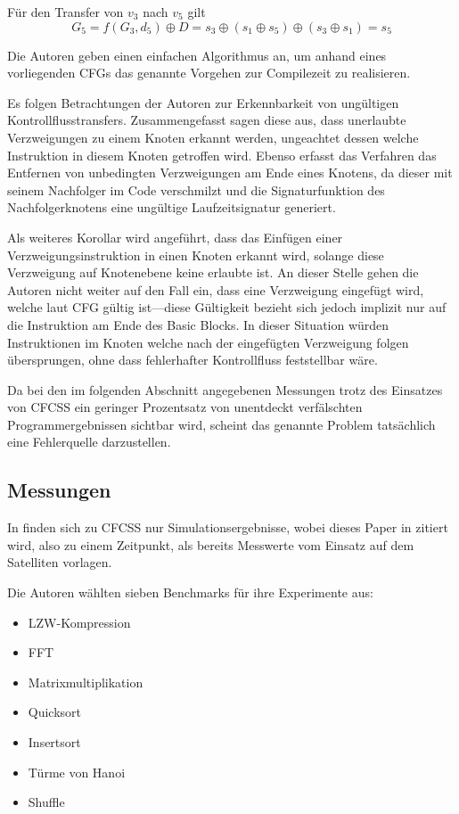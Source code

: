 \documentclass[11pt]{article}
\begin{document}
Für den Transfer von $ v_3 $ nach $ v_5 $ gilt $$ G_5 = f(G_3, d_5) \oplus
D = s_3 \oplus (s_1 \oplus s_5) \oplus (s_3 \oplus s_1) = s_5 $$

Die Autoren geben einen einfachen Algorithmus an, um anhand eines vorliegenden
CFGs das genannte Vorgehen zur Compilezeit zu realisieren.

Es folgen Betrachtungen der Autoren zur Erkennbarkeit von ungültigen
Kontrollflusstransfers. Zusammengefasst sagen diese aus, dass unerlaubte
Verzweigungen zu einem Knoten erkannt werden, ungeachtet dessen welche
Instruktion in diesem Knoten getroffen wird. Ebenso erfasst das Verfahren das
Entfernen von unbedingten Verzweigungen am Ende eines Knotens, da dieser mit
seinem Nachfolger im Code verschmilzt und die Signaturfunktion des
Nachfolgerknotens eine ungültige Laufzeitsignatur generiert.

Als weiteres Korollar wird angeführt, dass das Einfügen einer
Verzweigungsinstruktion in einen Knoten erkannt wird, solange diese Verzweigung
auf Knotenebene keine erlaubte ist. An dieser Stelle gehen die Autoren nicht
weiter auf den Fall ein, dass eine Verzweigung eingefügt wird, welche laut CFG
gültig ist—diese Gültigkeit bezieht sich jedoch implizit nur auf die
Instruktion am Ende des Basic Blocks. In dieser Situation würden Instruktionen
im Knoten welche nach der eingefügten Verzweigung folgen übersprungen, ohne
dass fehlerhafter Kontrollfluss feststellbar wäre.

Da bei den im folgenden Abschnitt angegebenen Messungen trotz des Einsatzes von
CFCSS ein geringer Prozentsatz von unentdeckt verfälschten Programmergebnissen
sichtbar wird, scheint das genannte Problem tatsächlich eine Fehlerquelle
darzustellen.

\subsection{Messungen}

In \cite{oh-2002-control} finden sich zu CFCSS nur Simulationsergebnisse, wobei
dieses Paper in \cite{argos-2002-lessons} zitiert wird, also zu einem
Zeitpunkt, als bereits Messwerte vom Einsatz auf dem Satelliten vorlagen.

Die Autoren wählten sieben Benchmarks für ihre Experimente aus:

\begin{itemize}
  \item LZW-Kompression
  \item FFT
  \item Matrixmultiplikation
  \item Quicksort
  \item Insertsort
  \item Türme von Hanoi
  \item Shuffle
\end{itemize}
\end{document}
